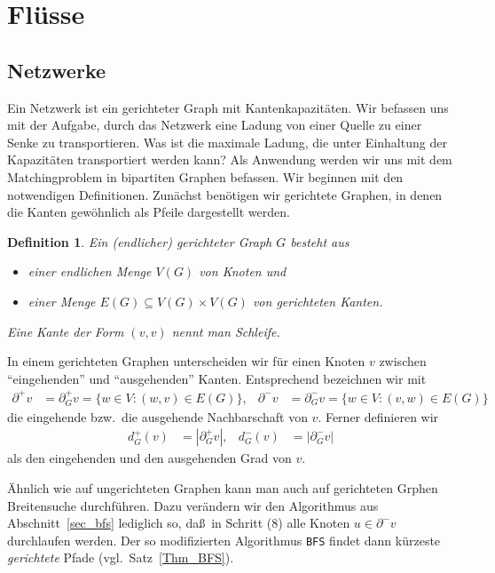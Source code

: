 \documentclass[10pt,reqno]{amsart}
\numberwithin{equation}{section}
\newcommand\alert[1]{\emph{#1}}
\newtheorem{definition}{Definition}[section]
\newcommand\Thm{Satz}
\begin{document}
\section{Fl\"usse}\label{sec_flow}

\subsection{Netzwerke}\label{sec_network}

Ein Netzwerk ist ein gerichteter Graph mit Kantenkapazit\"aten.
Wir befassen uns mit der Aufgabe, durch das Netzwerk eine Ladung von einer Quelle zu einer Senke zu transportieren.
Was ist die maximale Ladung, die unter Einhaltung der Kapazit\"aten transportiert werden kann?
Als Anwendung werden wir uns mit dem Matchingproblem in bipartiten Graphen befassen.
Wir beginnen mit den notwendigen Definitionen.
Zun\"achst ben\"otigen wir gerichtete Graphen, in denen die Kanten gew\"ohnlich als Pfeile dargestellt werden.

\begin{definition}
	Ein (endlicher) \alert{gerichteter Graph} $G$ besteht aus
	\begin{itemize}
		\item einer endlichen Menge $V(G)$ von \alert{Knoten} und
		\item einer Menge $E(G)\subseteq V(G)\times V(G)$ von \alert{gerichteten Kanten}.
	\end{itemize}
	Eine Kante der Form $(v,v)$ nennt man \alert{Schleife}.
\end{definition}

In einem gerichteten Graphen unterscheiden wir f\"ur einen Knoten $v$ zwischen ``eingehenden'' und ``ausgehenden'' Kanten.
Entsprechend bezeichnen wir mit
	\begin{align*}
			\partial^+v&=\partial_G^+v=\{w\in V:(w,v)\in E(G)\},&\partial^-v&=\partial_G^-v=\{w\in V:(v,w)\in E(G)\}
	\end{align*}
die eingehende bzw.\ die ausgehende Nachbarschaft von $v$.
Ferner definieren wir
		\begin{align*}
			d^+_G(v)&=|\partial^+_Gv|,&d^-_G(v)&=|\partial^-_Gv|
		\end{align*}
als den eingehenden und den ausgehenden Grad von $v$.

\"Ahnlich wie auf ungerichteten Graphen kann man auch auf gerichteten Grphen Breitensuche durchf\"uhren.
Dazu ver\"andern wir den Algorithmus aus Abschnitt~\ref{sec_bfs} lediglich so, da\ss\ in Schritt (8) alle Knoten $u\in\partial^-v$ durchlaufen werden.
Der so modifizierten Algorithmus {\tt BFS} findet dann k\"urzeste {\em gerichtete} Pfade (vgl.\ \Thm~\ref{Thm_BFS}).
\end{document}
